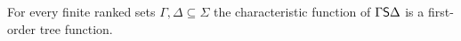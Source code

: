 \begin{lemma}\label{lem:sincemod}
    For every finite ranked sets $\Gamma, \Delta \subseteq \Sigma$  the characteristic function of $\Gamma \mathsf S \Delta$ is a first-order tree function.
\end{lemma}
\begin{pr}

\end{pr}

         
